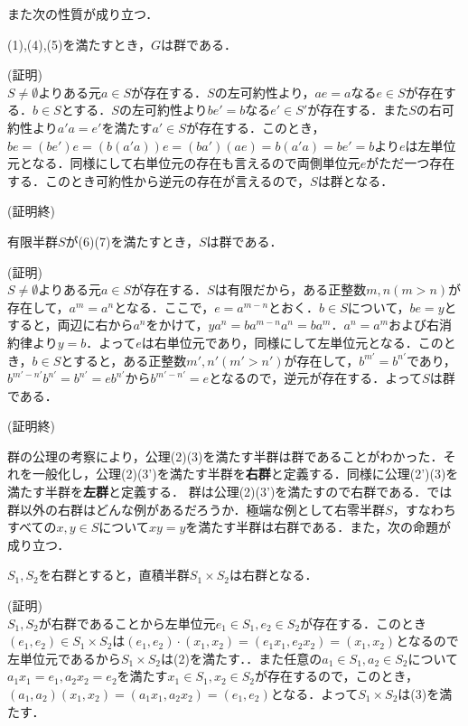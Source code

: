 また次の性質が成り立つ．
\begin{sthm}
(1),(4),(5)を満たすとき，$G$は群である．
\end{sthm}
(証明)\\
$S\neq\emptyset$よりある元$a\in S$が存在する．$S$の左可約性より，$ae=a$なる$e\in S$が存在する．$b\in S$とする．$S$の左可約性より$be'=b$なる$e'\in S'$が存在する．また$S$の右可約性より$a'a=e'$を満たす$a'\in S$が存在する．このとき，$be=(be')e=(b(a'a))e=(ba')(ae)=b(a'a)=be'=b$より$e$は左単位元となる．同様にして右単位元の存在も言えるので両側単位元$e$がただ一つ存在する．このとき可約性から逆元の存在が言えるので，$S$は群となる．
\begin{flushright}
(証明終)
\end{flushright}
\begin{sthm}
有限半群$S$が(6)(7)を満たすとき，$S$は群である．
\end{sthm}
(証明)\\
$S\neq\emptyset$よりある元$a\in S$が存在する．$S$は有限だから，ある正整数$m,n(m>n)$が存在して，$a^m=a^n$となる．ここで，$e=a^{m-n}$とおく．$b\in S$について，$be=y$とすると，両辺に右から$a^n$をかけて，$ya^n=ba^{m-n}a^n=ba^m$．$a^n=a^m$および右消約律より$y=b$．よって$e$は右単位元であり，同様にして左単位元となる．このとき，$b\in S$とすると，ある正整数$m',n'(m'>n')$が存在して，$b^{m'}=b^{n'}$であり，$b^{m'-n'}b^{n'}=b^{n'}=eb^{n'}$から$b^{m'-n'}=e$となるので，逆元が存在する．よって$S$は群である．
\begin{flushright}
(証明終)
\end{flushright}
群の公理の考察により，公理(2)(3)を満たす半群は群であることがわかった．それを一般化し，公理(2)(3')を満たす半群を{\bf 右群}と定義する．同様に公理(2')(3)を満たす半群を{\bf 左群}と定義する．
群は公理(2)(3')を満たすので右群である．では群以外の右群はどんな例があるだろうか．極端な例として右零半群$S$，すなわちすべての$x,y\in S$について$xy=y$を満たす半群は右群である．また，次の命題が成り立つ．
\begin{sprop}
$S_1,S_2$を右群とすると，直積半群$S_1\times S_2$は右群となる．
\end{sprop}
(証明)\\
$S_1,S_2$が右群であることから左単位元$e_1\in S_1,e_2\in S_2$が存在する．このとき$(e_1,e_2)\in S_1\times S_2$は$(e_1,e_2)\cdot(x_1,x_2)=(e_1x_1,e_2x_2)=(x_1,x_2)$となるので左単位元であるから$S_1\times S_2$は(2)を満たす．．また任意の$a_1\in S_1,a_2\in S_2$について$a_1x_1=e_1,a_2x_2=e_2$を満たす$x_1\in S_1,x_2\in S_2$が存在するので，このとき，$(a_1,a_2)(x_1,x_2)=(a_1x_1,a_2x_2)=(e_1,e_2)$となる．よって$S_1\times S_2$は(3)を満たす．
